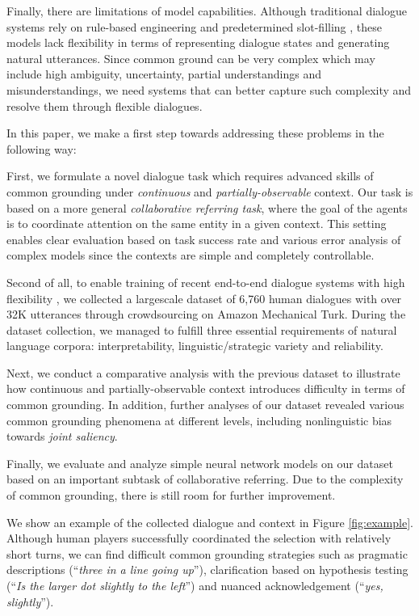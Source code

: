 \documentclass[letterpaper]{article} %
\newcommand{\utterance}[1]{``#1''}
\begin{document}
Finally, there are limitations of model capabilities. Although traditional dialogue systems rely on rule-based engineering and predetermined slot-filling \cite{traum1994computational,young2013pomdp,williams2016dialog}, these models lack flexibility in terms of representing dialogue states and generating natural utterances. Since common ground can be very complex which may include high ambiguity, uncertainty, partial understandings and misunderstandings, we need systems that can better capture such complexity and resolve them through flexible dialogues.

In this paper, we make a first step towards addressing these problems in the following way:

First, we formulate a novel dialogue task which requires advanced skills of common grounding under \emph{continuous} and \emph{partially-observable} context. Our task is based on a more general \emph{collaborative referring task}, where the goal of the agents is to coordinate attention on the same entity in a given context. This setting enables clear evaluation based on task success rate and various error analysis of complex models since the contexts are simple and completely controllable.

Second of all, to enable training of recent end-to-end dialogue systems with high flexibility \cite{bordes2016learning,lewis2017deal}, we collected a largescale dataset of 6,760 human dialogues with over 32K utterances through crowdsourcing on Amazon Mechanical Turk. During the dataset collection, we managed to fulfill three essential requirements of natural language corpora: interpretability, linguistic/strategic variety and reliability.

Next, we conduct a comparative analysis with the previous dataset to illustrate how continuous and partially-observable context introduces difficulty in terms of common grounding. In addition, further analyses of our dataset revealed various common grounding phenomena at different levels, including nonlinguistic bias towards \emph{joint saliency}.

Finally, we evaluate and analyze simple neural network models on our dataset based on an important subtask of collaborative referring. Due to the complexity of common grounding, there is still room for further improvement.

We show an example of the collected dialogue and context in Figure \ref{fig:example}. Although human players successfully coordinated the selection with relatively short turns, we can find difficult common grounding strategies such as pragmatic descriptions (\utterance{\textit{three in a line going up}}), clarification based on hypothesis testing (\utterance{\textit{Is the larger dot slightly to the left}}) and nuanced acknowledgement (\utterance{\textit{yes, slightly}}).
\end{document}
